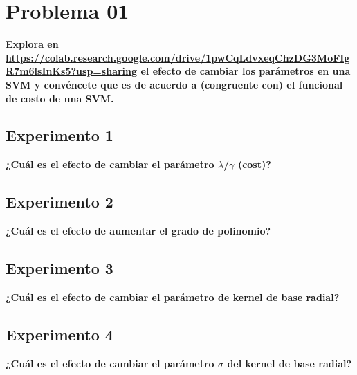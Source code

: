 \section*{Problema 01}

\textbf{Explora en
	\url{https://colab.research.google.com/drive/1pwCqLdvxeqChzDG3MoFIgR7m6lsInKs5?usp=sharing} el efecto de cambiar los parámetros en una SVM y convéncete que es de acuerdo a (congruente con) el funcional de costo de una SVM.}

\subsection*{Experimento 1}

\textbf{¿Cuál es el efecto de cambiar el parámetro $\lambda$/$\gamma$ (cost)?}

\subsection*{Experimento 2}

\textbf{¿Cuál es el efecto de aumentar el grado de polinomio?}

\subsection*{Experimento 3}

\textbf{¿Cuál es el efecto de cambiar el parámetro de kernel de base radial?}

\subsection*{Experimento 4}

\textbf{¿Cuál es el efecto de cambiar el parámetro $\sigma$ del kernel de base radial?}

